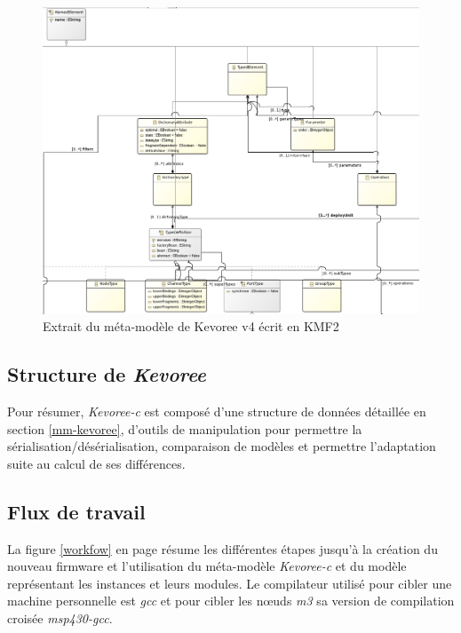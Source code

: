 \begin{figure}[ht!]
\centering
\includegraphics[scale=0.4]{images/kevoree-cd.png}
\caption{Extrait du méta-modèle de Kevoree v4 écrit en KMF2}
\label{kevoree-cd}
\end{figure}

\subsection{Structure de \emph{Kevoree}}

Pour résumer, \emph{Kevoree-c} est composé d'une structure de données détaillée en section \ref{mm-kevoree}, d'outils de manipulation pour permettre la sérialisation/désérialisation, comparaison de modèles et permettre l'adaptation suite au calcul de ses différences.

\subsection{Flux de travail}

La figure \ref{workfow} en page \pageref{workfow} résume les différentes étapes jusqu'à la création du nouveau firmware et l'utilisation du méta-modèle \emph{Kevoree-c} et du modèle représentant les instances et leurs modules. Le compilateur utilisé pour cibler une machine personnelle est \emph{gcc} et pour cibler les nœuds \emph{m3} sa version de compilation croisée \emph{msp430-gcc}.


